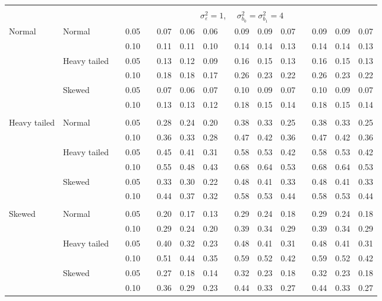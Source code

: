 \documentclass[11pt]{article} %
\begin{document}
\begin{table}[ht]
\begin{scriptsize}
\begin{center}
\begin{tabular}{ll p{.1cm} c p{.1cm} rrr p{.1cm} rrr p{.1cm} rrr}
&&&&&&&&&&&&&&&\\
& && && \multicolumn{9}{c}{$\sigma_{\varepsilon}^2 = 1$, \ \ $\sigma_{b_0}^2 = \sigma_{b_1}^2 = 4$} \\ \cline{6-16}
Normal       & Normal       && 0.05 &&  0.07 & 0.06 & 0.06 && 0.09 & 0.09 & 0.07 && 0.09 & 0.09 & 0.07 \\ 
             &              && 0.10 &&  0.11 & 0.11 & 0.10 && 0.14 & 0.14 & 0.13 && 0.14 & 0.14 & 0.13 \\ 
             & Heavy tailed && 0.05 &&  0.13 & 0.12 & 0.09 && 0.16 & 0.15 & 0.13 && 0.16 & 0.15 & 0.13 \\ 
             &              && 0.10 &&  0.18 & 0.18 & 0.17 && 0.26 & 0.23 & 0.22 && 0.26 & 0.23 & 0.22 \\ 
             & Skewed       && 0.05 &&  0.07 & 0.06 & 0.07 && 0.10 & 0.09 & 0.07 && 0.10 & 0.09 & 0.07 \\ 
             &              && 0.10 &&  0.13 & 0.13 & 0.12 && 0.18 & 0.15 & 0.14 && 0.18 & 0.15 & 0.14 \\ 
             &&&&&&&&&&&&&&&\\
Heavy tailed & Normal       && 0.05 &&  0.28 & 0.24 & 0.20 && 0.38 & 0.33 & 0.25 && 0.38 & 0.33 & 0.25 \\ 
             &              && 0.10 &&  0.36 & 0.33 & 0.28 && 0.47 & 0.42 & 0.36 && 0.47 & 0.42 & 0.36 \\ 
             & Heavy tailed && 0.05 &&  0.45 & 0.41 & 0.31 && 0.58 & 0.53 & 0.42 && 0.58 & 0.53 & 0.42 \\ 
             &              && 0.10 &&  0.55 & 0.48 & 0.43 && 0.68 & 0.64 & 0.53 && 0.68 & 0.64 & 0.53 \\ 
             & Skewed       && 0.05 &&  0.33 & 0.30 & 0.22 && 0.48 & 0.41 & 0.33 && 0.48 & 0.41 & 0.33 \\ 
             &              && 0.10 &&  0.44 & 0.37 & 0.32 && 0.58 & 0.53 & 0.44 && 0.58 & 0.53 & 0.44 \\ 
             &&&&&&&&&&&&&&&\\
Skewed       & Normal       && 0.05 &&  0.20 & 0.17 & 0.13 && 0.29 & 0.24 & 0.18 && 0.29 & 0.24 & 0.18 \\ 
             &              && 0.10 &&  0.29 & 0.24 & 0.20 && 0.39 & 0.34 & 0.29 && 0.39 & 0.34 & 0.29 \\ 
             & Heavy tailed && 0.05 &&  0.40 & 0.32 & 0.23 && 0.48 & 0.41 & 0.31 && 0.48 & 0.41 & 0.31 \\ 
             &              && 0.10 &&  0.51 & 0.44 & 0.35 && 0.59 & 0.52 & 0.42 && 0.59 & 0.52 & 0.42 \\ 
             & Skewed       && 0.05 &&  0.27 & 0.18 & 0.14 && 0.32 & 0.23 & 0.18 && 0.32 & 0.23 & 0.18 \\ 
             &              && 0.10 &&  0.36 & 0.29 & 0.23 && 0.44 & 0.33 & 0.27 && 0.44 & 0.33 & 0.27 \\ 



\end{tabular}
\end{center}
\end{scriptsize}
\end{table}
\end{document}
